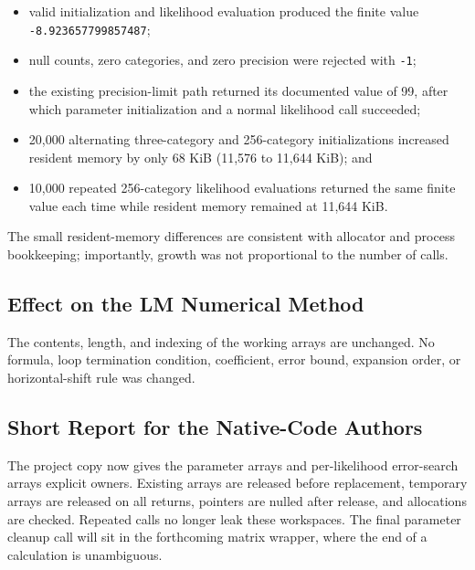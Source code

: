 \documentclass[11pt,a4paper]{article}
\begin{document}
\begin{itemize}

\item valid initialization and likelihood evaluation produced the finite
value \texttt{-8.923657799857487};

\item null counts, zero categories, and zero precision were rejected with
\texttt{-1};

\item the existing precision-limit path returned its documented value of 99,
after which parameter initialization and a normal likelihood call succeeded;

\item 20,000 alternating three-category and 256-category initializations
increased resident memory by only 68 KiB (11,576 to 11,644 KiB); and

\item 10,000 repeated 256-category likelihood evaluations returned the same
finite value each time while resident memory remained at 11,644 KiB.

\end{itemize}

The small resident-memory differences are consistent with allocator and process
bookkeeping; importantly, growth was not proportional to the number of calls.

\subsection{Effect on the LM Numerical Method}

The contents, length, and indexing of the working arrays are unchanged. No
formula, loop termination condition, coefficient, error bound, expansion order,
or horizontal-shift rule was changed.

\subsection{Short Report for the Native-Code Authors}

The project copy now gives the parameter arrays and per-likelihood error-search
arrays explicit owners. Existing arrays are released before replacement,
temporary arrays are released on all returns, pointers are nulled after release,
and allocations are checked. Repeated calls no longer leak these workspaces.
The final parameter cleanup call will sit in the forthcoming matrix wrapper,
where the end of a calculation is unambiguous.
\end{document}
